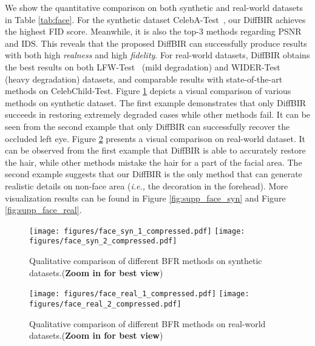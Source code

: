 \documentclass{article}
\begin{document}
We show the quantitative comparison on both synthetic and real-world datasets in Table \ref{tab:face}. For the synthetic dataset CelebA-Test~\cite{celeba}, our DiffBIR achieves the highest FID score. Meanwhile, it is also the top-3 methods regarding PSNR and IDS. This reveals that the proposed DiffBIR can successfully produce results with both high \textit{realness} and high \textit{fidelity}. 
For real-world datasets, DiffBIR obtains the best results on both LFW-Test~\cite{lfw} (mild degradation) and WIDER-Test~\cite{codeformer} (heavy degradation) datasets, and comparable results with state-of-the-art methods on CelebChild-Test.
Figure \ref{fig:face_syn} depicts a visual comparison of various methods on synthetic dataset. The first example demonstrates that only DiffBIR succeeds in restoring extremely degraded cases while other methods fail. It can be seen from the second example that only DiffBIR can successfully recover the occluded left eye. Figure \ref{fig:face_real} presents a visual comparison on real-world dataset.  It can be observed from the first example that DiffBIR is able to accurately restore the hair, while other methods mistake the hair for a part of the facial area. The second example suggests that our DiffBIR is the only method that can generate realistic details on non-face area (\textit{i.e.,} the decoration in the forehead).
More visualization results can be found in Figure \ref{fig:supp_face_syn} and Figure \ref{fig:supp_face_real}.

\begin{figure}[h]
\centering
\texttt{[image: figures/face\_syn\_1\_compressed.pdf]}
\texttt{[image: figures/face\_syn\_2\_compressed.pdf]}
\vspace{-1em}
\caption{\small Qualitative comparison of different BFR methods on synthetic datasets.(\textbf{Zoom in for best view})}
\label{fig:face_syn}
\vspace{-2em}
\end{figure}

\begin{figure}[h]
\centering
\texttt{[image: figures/face\_real\_1\_compressed.pdf]}
\texttt{[image: figures/face\_real\_2\_compressed.pdf]} 
\vspace{-1em}
\caption{\small Qualitative comparison of different BFR methods on real-world datasets.(\textbf{Zoom in for best view})}
\label{fig:face_real}
\vspace{-1em}
\end{figure}
\end{document}
